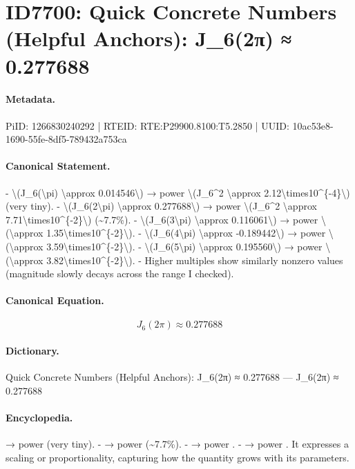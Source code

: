 \section*{ID7700: Quick Concrete Numbers (Helpful Anchors): J\_6(2π) ≈ 0.277688}
\paragraph{Metadata.}
PiID: 1266830240292 | RTEID: RTE:P29900.8100:T5.2850 | UUID: 10ac53e8-1690-55fe-8df5-789432a753ca

\paragraph{Canonical Statement.}
- \textbackslash{}(J\_6(\textbackslash{}pi) \textbackslash{}approx 0.014546\textbackslash{}) → power \textbackslash{}(J\_6\textasciicircum{}2 \textbackslash{}approx 2.12\textbackslash{}times10\textasciicircum{}\{-4\}\textbackslash{}) (very tiny). - \textbackslash{}(J\_6(2\textbackslash{}pi) \textbackslash{}approx 0.277688\textbackslash{}) → power \textbackslash{}(J\_6\textasciicircum{}2 \textbackslash{}approx 7.71\textbackslash{}times10\textasciicircum{}\{-2\}\textbackslash{}) (\textasciitilde{}7.7\%). - \textbackslash{}(J\_6(3\textbackslash{}pi) \textbackslash{}approx 0.116061\textbackslash{}) → power \textbackslash{}(\textbackslash{}approx 1.35\textbackslash{}times10\textasciicircum{}\{-2\}\textbackslash{}). - \textbackslash{}(J\_6(4\textbackslash{}pi) \textbackslash{}approx -0.189442\textbackslash{}) → power \textbackslash{}(\textbackslash{}approx 3.59\textbackslash{}times10\textasciicircum{}\{-2\}\textbackslash{}). - \textbackslash{}(J\_6(5\textbackslash{}pi) \textbackslash{}approx 0.195560\textbackslash{}) → power \textbackslash{}(\textbackslash{}approx 3.82\textbackslash{}times10\textasciicircum{}\{-2\}\textbackslash{}). - Higher multiples show similarly nonzero values (magnitude slowly decays across the range I checked).

\paragraph{Canonical Equation.}
\[
J_6(2\pi) \approx 0.277688
\]

\paragraph{Dictionary.}
Quick Concrete Numbers (Helpful Anchors): J\_6(2π) ≈ 0.277688 — J\_6(2π) ≈ 0.277688

\paragraph{Encyclopedia.}
→ power (very tiny). - → power (\textasciitilde{}7.7\%). - → power . - → power . It expresses a scaling or proportionality, capturing how the quantity grows with its parameters.
